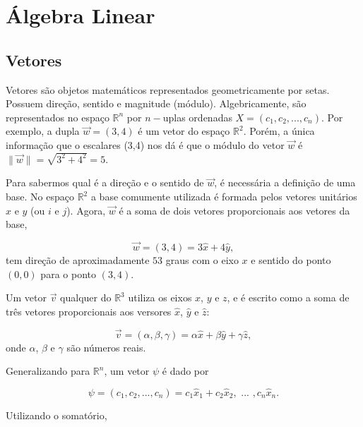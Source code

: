 \chapter{Álgebra Linear\label{cap:algebra}}

\section{Vetores}
Vetores são objetos matemáticos representados geometricamente por setas. Possuem direção, sentido e magnitude (módulo). Algebricamente, são representados no espaço $\mathbb{R}^n$ por $n-$uplas ordenadas $X = (c_1, c_2, ..., c_n)$. Por exemplo, a dupla $\vec{w} = (3,4)$ é um vetor do espaço $\mathbb{R}^2$. Porém, a única informação que o escalares (3,4) nos dá é que o módulo do vetor $\vec{w}$ é $\| \vec{w} \| = \sqrt{3^2 + 4^2} = 5$.

Para sabermos qual é a direção e o sentido de $\vec{w}$, é necessária a definição de uma base. No espaço $\mathbb{R}^2$ a base comumente utilizada é formada pelos vetores unitários $\hat{x}$ e $\hat{y}$ (ou $i$ e $j$). Agora, $\vec{w}$ é a soma de dois vetores proporcionais aos vetores da base,

\begin{equation}\label{eq_vetorNaBase}
	\vec{w} = (3,4) = 3\hat{x} + 4\hat{y},
\end{equation}
tem direção de aproximadamente $53$ graus com o eixo $x$ e sentido do ponto $(0,0)$ para o ponto $(3,4)$.

Um vetor $\vec{v}$ qualquer do $\mathbb{R}^3$ utiliza os eixos $x$, $y$ e $z$, e é escrito como a soma de três vetores proporcionais aos versores $\hat{x}$, $\hat{y}$ e $\hat{z}$:

\begin{equation}
	\vec{v} = (\alpha,\beta,\gamma) = \alpha\hat{x} + \beta \hat{y} + \gamma\hat{z},
\end{equation}
onde $\alpha$, $\beta$ e $\gamma$ são números reais.

Generalizando para $\mathbb{R}^n$, um vetor $\psi$ é dado por

\begin{equation}
	\psi = (c_1, c_2, ..., c_n) = c_1\hat{x}_1 + c_2\hat{x}_2, \mbox{ ... }, c_n\hat{x}_n.
\end{equation}

Utilizando o somatório,  


